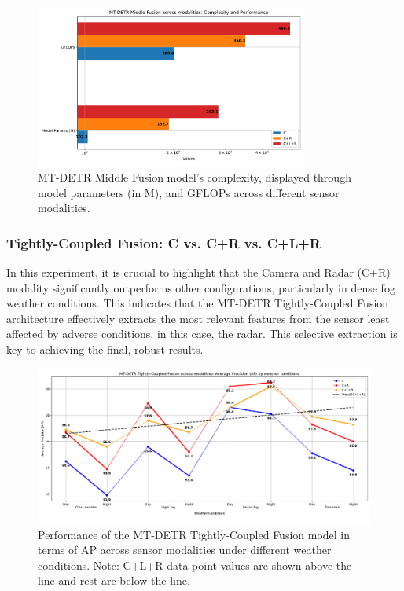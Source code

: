 \documentclass[report.tex]{subfiles}
\begin{document}
    \begin{figure}[h!]
        \centering
        \includegraphics[width=0.8\textwidth]{images/results/mtdetr/middle/model_complexity.pdf}
        \caption{MT-DETR Middle Fusion model's complexity, displayed through model parameters (in M), and GFLOPs across different sensor modalities.}
        \label{fig:mtdetr_middle_model_complexity}
    \end{figure}

    \FloatBarrier
    \subsubsection{Tightly-Coupled Fusion: C vs. C+R vs. C+L+R}

    In this experiment, it is crucial to highlight that the Camera and Radar (C+R) modality significantly outperforms other configurations, particularly in dense fog weather conditions. This indicates that the MT-DETR Tightly-Coupled Fusion architecture effectively extracts the most relevant features from the sensor least affected by adverse conditions, in this case, the radar. This selective extraction is key to achieving the final, robust results.

    \begin{figure}[h!]
        \centering
        \includegraphics[width=1.0\textwidth]{images/results/mtdetr/tight/ap.pdf}
        \caption{Performance of the MT-DETR Tightly-Coupled Fusion model in terms of AP across sensor modalities under different weather conditions. Note: C+L+R data point values are shown above the line and rest are below the line.}
        \label{fig:mtdetr_tight_ap}
    \end{figure}
\end{document}
